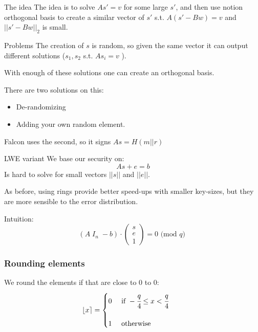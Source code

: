 \documentclass[presentation]{beamer}
\begin{document}
\begin{frame}[label=the-idea]{The idea}
  The idea is to solve \(As' = v\) for some large \(s'\), and
  then use
  notion orthogonal basis to create a similar vector of \(s'\)
  s.t.
  \(A(s' -Bw) = v\) and \(||s' - Bw||_2\) is small.
\end{frame}
\begin{frame}[label=problems]{Problems}
  The creation of \(s\) is random, so given the same vector
  it \alert{can}
  output different solutions (\(s_1, s_2\) s.t. \(As_i = v\) ).

  With enough of these solutions one can create an orthogonal
  basis.

  There are two solutions on this:

  \begin{itemize}
    \item De-randomizing
    \item Adding your own random element.
  \end{itemize}

  Falcon uses the second, so it signs \(As = H(m || r)\)
\end{frame}
\begin{frame}[label=lwe-variant]{LWE variant}
  We base our security on:
  \[
    As + e = b
  \]
  Is hard to solve for small vectors $||s||$ and $||e||$.

  As before, using rings provide better speed-ups with 
  smaller key-sizes, \alert{but} they are more sensible 
  to the error distribution. \pause

  Intuition:
  \[
    (A \; I_n \;-b)\cdot \left( 
      \begin{array}{c}
        s 
        \\e 
        \\1 
      \end{array}
    \right) = 0 \text{ (mod $q$) }
  \]
\end{frame}
\begin{frame}[label=rounding]
  \frametitle{Rounding elements}
  We round the elements if that are close to $0$ to 0:
  \begin{equation}
    \lfloor x \rceil = \begin{cases}
      0 &\text{ if } -\cfrac{q}{4} \leq x < \cfrac{q}{4} \\
      \\
      1 &\text{ otherwise}
    \end{cases} \qquad
  \end{equation}
\end{frame}
\end{document}
